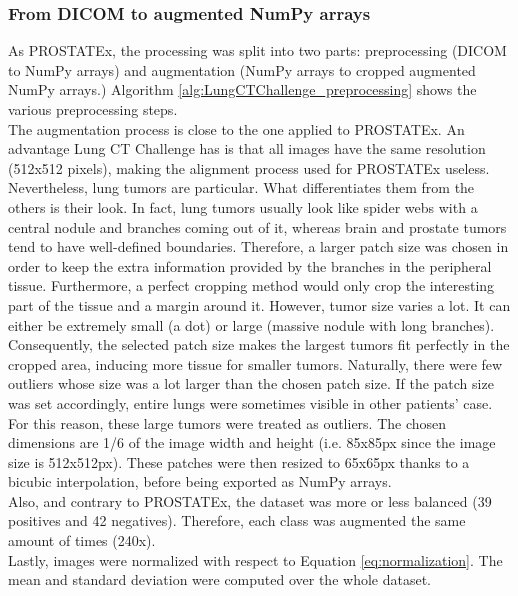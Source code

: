 \subsubsection{From DICOM to augmented NumPy arrays}
\setlength{\marginparwidth}{3cm}\leavevmode {}As PROSTATEx, the processing was split into two parts: preprocessing (DICOM to NumPy arrays) and augmentation (NumPy arrays to cropped augmented NumPy arrays.) Algorithm \ref{alg:LungCTChallenge_preprocessing} shows the various preprocessing steps.\\
The augmentation process is close to the one applied to PROSTATEx. An advantage Lung CT Challenge has is that all images have the same resolution (512x512 pixels), making the alignment process used for PROSTATEx useless. Nevertheless, lung tumors are particular. What differentiates them from the others is their look. In fact, lung tumors usually look like spider webs with a central nodule and branches coming out of it, whereas brain and prostate tumors tend to have well-defined boundaries. Therefore, a larger patch size was chosen in order to keep the extra information provided by the branches in the peripheral tissue. Furthermore, a perfect cropping method would only crop the interesting part of the tissue and a margin around it. However, tumor size varies a lot. It can either be extremely small (a dot) or large (massive nodule with long branches). Consequently, the selected patch size makes the largest tumors fit perfectly in the cropped area, inducing more tissue for smaller tumors. Naturally, there were few outliers whose size was a lot larger than the chosen patch size. If the patch size was set accordingly, entire lungs were sometimes visible in other patients' case. For this reason, these large tumors were treated as outliers. The chosen dimensions are 1/6 of the image width and height (i.e. 85x85px since the image size is 512x512px). These patches were then resized to 65x65px thanks to a bicubic interpolation, before being exported as NumPy arrays.\\
Also, and contrary to PROSTATEx, the dataset was more or less balanced (39 positives and 42 negatives). Therefore, each class was augmented the same amount of times (240x).\\
Lastly, images were normalized with respect to Equation \ref{eq:normalization}. The mean and standard deviation were computed over the whole dataset. 

